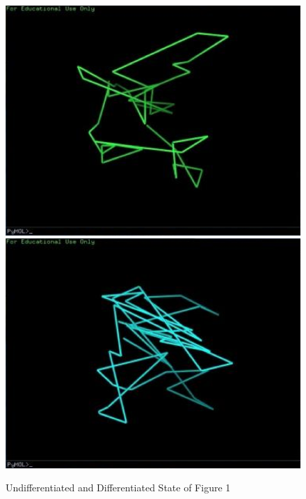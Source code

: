 \documentclass[12pt]{article} %
\begin{document}
	\begin{figure}[ht]\centering
		\includegraphics[scale=0.3]{Figure_2}
		\includegraphics[scale=0.3]{Figure_3}
		\caption{Undifferentiated and Differentiated State of Figure 1}
	\end{figure}
\end{document}
